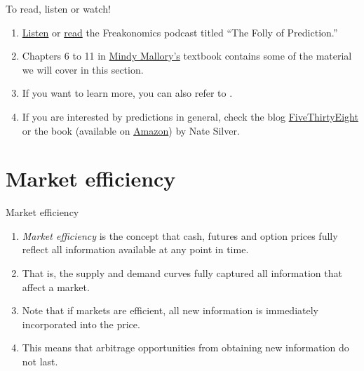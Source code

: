 \documentclass[table,xcolor=pdftex,dvipsnames, handout]{beamer}\usepackage[]{graphicx}\usepackage[]{color}
\begin{document}

\begin{frame}{To read, listen or watch!}
\begin{enumerate}[label=\textbullet]
  \item \href{http://www.freakonomics.com/2011/09/14/new-freakonomics-radio-podcast-the-folly-of-prediction/}{Listen} or \href{http://www.freakonomics.com/2011/06/30/the-folly-of-prediction-full-transcript/}{read} the Freakonomics podcast titled ``The Folly of Prediction.''
  \item Chapters 6 to 11 in \href{http://mindymallory.github.io/PriceAnalysis/}{Mindy Mallory's} textbook contains some of the material we will cover in this section.
  \item If you want to learn more, you can also refer to \cite{Carter2003}.
  \item If you are interested by predictions in general, check the blog \href{http://www.fivethirtyeight.com/}{FiveThirtyEight} or the book (available on \href{http://www.amazon.com/The-Signal-Noise-Predictions-ebook/dp/B007V65R54/ref=dp_kinw_strp_1}{Amazon}) by Nate Silver.
\end{enumerate}
\end{frame}

\section{Market efficiency}

\begin{frame}{Market efficiency}
\begin{enumerate}[label=\textbullet]
  \item \emph{Market efficiency} is the concept that cash, futures and option prices fully reflect all information available at any point in time.
  \item That is, the supply and demand curves fully captured all information that affect a market.
  \item Note that if markets are efficient, all new information is immediately incorporated into the price.
  \item This means that arbitrage opportunities from obtaining new information do not last.
\end{enumerate}
\end{frame}
\end{document}
